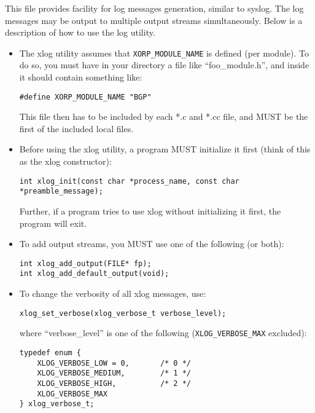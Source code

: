 \documentclass[11pt]{article}
\begin{document}
This file provides facility for log messages generation, similar to
syslog. The log messages may be output to multiple output streams
simultaneously. Below is a description of how to use the log utility.

\begin{itemize}

  \item The xlog utility assumes that \verb=XORP_MODULE_NAME= is defined
   (per module). To do so, you must have in your directory a file like
   ``foo\_module.h'', and inside it should contain something like:

\begin{verbatim}
#define XORP_MODULE_NAME "BGP"
\end{verbatim}

   This file then has to be included by each *.c and *.cc file,
   and MUST be the first of the included local files.

  \item Before using the xlog utility, a program MUST initialize it
   first (think of this as the xlog constructor):

\begin{verbatim}
int xlog_init(const char *process_name, const char *preamble_message);
\end{verbatim}

   Further, if a program tries to use xlog without initializing it
   first, the program will exit.

  \item To add output streams, you MUST use one of the following (or both):

\begin{verbatim}
int xlog_add_output(FILE* fp);
int xlog_add_default_output(void);
\end{verbatim}

  \item To change the verbosity of all xlog messages, use:

\begin{verbatim}
xlog_set_verbose(xlog_verbose_t verbose_level);
\end{verbatim}

   where ``verbose\_level'' is one of the following (\verb=XLOG_VERBOSE_MAX=
   excluded):

\begin{verbatim}
typedef enum {
    XLOG_VERBOSE_LOW = 0,       /* 0 */
    XLOG_VERBOSE_MEDIUM,        /* 1 */
    XLOG_VERBOSE_HIGH,          /* 2 */
    XLOG_VERBOSE_MAX
} xlog_verbose_t;
\end{verbatim}


\end{itemize}
\end{document}
